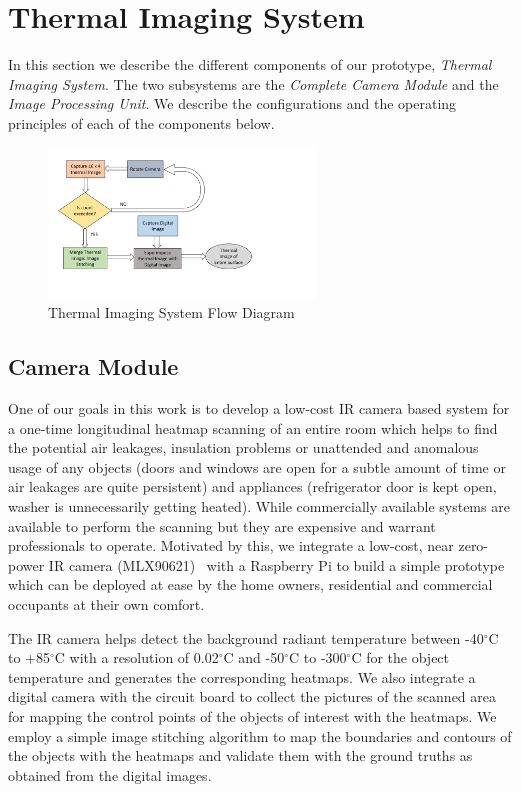\section{Thermal Imaging System}
In this section we describe the different components of our prototype, {\it Thermal Imaging System}. The two subsystems are the {\it Complete Camera Module} and the {\it Image Processing Unit}. We describe the configurations and the operating principles of each of the components below.

\begin{figure}[!htb]
\begin{center}
 \includegraphics[width=2.8in]{figs/FlowDiagram.pdf} 
 \caption{Thermal Imaging System Flow Diagram}
 \label{fig:Flow}
\end{center}
\end{figure}
	
	
\subsection{Camera Module}
\label{sec:camera}

One of our goals in this work is to develop a low-cost IR camera based system for a one-time longitudinal heatmap scanning of an entire room which helps to find the potential air leakages, insulation problems or unattended and anomalous usage of any objects (doors and windows are open for a subtle amount of time or air leakages are quite persistent) and appliances (refrigerator door is kept open, washer is unnecessarily getting heated). While commercially available systems are available to perform the scanning but they are expensive and warrant professionals to operate. Motivated by this, we integrate a low-cost, near zero-power IR camera (MLX90621)~\cite{MLX} with a Raspberry Pi to build a simple prototype which can be deployed at ease by the home owners, residential and commercial occupants at their own comfort. 

The IR camera helps detect the background radiant temperature between -40$^{\circ}$C to +85$^{\circ}$C with a resolution of 0.02$^{\circ}$C and -50$^{\circ}$C to -300$^{\circ}$C for the object temperature and generates the corresponding heatmaps. We also integrate a digital camera with the circuit board to collect the  pictures of the scanned area for mapping the control points of the objects of interest with the heatmaps. We employ a simple image stitching algorithm to map the boundaries and contours of the objects with the heatmaps and validate them with the ground truths as obtained from the digital images. 

